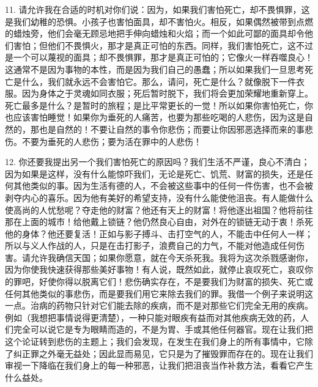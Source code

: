 11. 请允许我在合适的时机对你们说：因为，如果我们害怕死亡，却不畏惧罪，这是我们幼稚的恐惧。小孩子也害怕面具，却不害怕火。相反，如果偶然被带到点燃的蜡烛旁，他们会毫无顾忌地把手伸向蜡烛和火焰；而一个如此可鄙的面具却令他们害怕；但他们不畏惧火，那才是真正可怕的东西。同样，我们害怕死亡，这不过是一个可以蔑视的面具；却不畏惧罪，那才是真正可怕的；它像火一样吞噬良心！这通常不是因为事物的本性，而是因为我们自己的愚蠢；所以如果我们一旦思考死亡是什么，我们就永远不会害怕它。那么，请问，死亡是什么？就像脱下一件衣服。因为身体之于灵魂如同衣服；死后暂时脱下，我们将会更加荣耀地重新穿上。死亡最多是什么？是暂时的旅程；是比平常更长的一觉！所以如果你害怕死亡，你也应该害怕睡觉！如果你为垂死的人痛苦，也要为那些吃喝的人悲伤，因为这是自然的，那也是自然的！不要让自然的事令你悲伤；而要让你因邪恶选择而来的事悲伤。不要为垂死的人悲伤；要为活在罪中的人悲伤！\par

12. 你还要我提出另一个我们害怕死亡的原因吗？我们生活不严谨，良心不清白；因为如果是这样，没有什么能惊吓我们，无论是死亡、饥荒、财富的损失，还是任何其他类似的事。因为生活有德的人，不会被这些事中的任何一件伤害，也不会被剥夺内心的喜乐。因为他有美好的希望支持，没有什么能使他沮丧。有人能做什么使高尚的人忧愁呢？夺走他的财富？他还有天上的财富！将他逐出祖国？他将前往那在上面的城市！给他戴上锁链？他仍然良心自由，对外在的锁链无动于衷！杀死他的身体？他还要复活！正如与影子搏斗、击打空气的人，不能击中任何人一样；所以与义人作战的人，只是在击打影子，浪费自己的力气，不能对他造成任何伤害。请允许我确信天国；如果你愿意，就在今天杀死我。我将为这次杀戮感谢你，因为你使我快速获得那些美好事物！有人说，既然如此，就停止哀叹死亡，哀叹你的罪吧，好使你得以脱离它们！悲伤确实存在，不是要我们为财富的损失、死亡或任何其他类似的事悲伤，而是要我们用它来除去我们的罪。我借一个例子来说明这一点。治病的药物只针对它们能去除的疾病，而不是对那些它们完全无用的疾病。例如（我想把事情说得更清楚），一种只能对眼疾有益而对其他疾病无效的药，人们完全可以说它是专为眼睛而造的，不是为胃、手或其他任何器官。现在让我们把这个论证转到悲伤的主题上；我们会发现，在发生在我们身上的所有事情中，它除了纠正罪之外毫无益处；因此显而易见，它只是为了摧毁罪而存在的。现在让我们审视一下降临在我们身上的每一种邪恶，让我们把沮丧当作补救方法，看看它产生什么益处。\par

